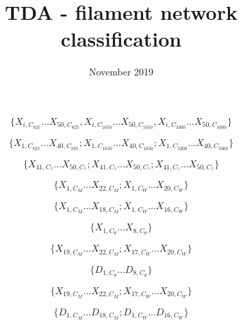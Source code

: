 \documentclass[10pt]{article}
\title{TDA - filament network classification}
\date{November 2019}
\begin{document}
\maketitle



$$
\{X_{i,C_{825}}...X_{50,C_{825}}, X_{i,C_{1650}}...X_{50,C_{1650}},X_{i,C_{3300}}...X_{50,C_{3300}}\}
$$


$$
\{X_{1,C_{825}}...X_{40,C_{825}}; X_{1,C_{1650}}...X_{40,C_{1650}}; X_{1,C_{3300}}...X_{40,C_{3300}}\}
$$

$$
\{X_{41,C_{?}}...X_{50,C_{?}}; X_{41,C_{?}}...X_{50,C_{?}}; X_{41,C_{?}}...X_{50,C_{?}}\}
$$


$$
\{X_{1,C_M}...X_{22,C_{M}}; X_{1,C_{W}}...X_{20,C_W}\}
$$

$$
\{X_{1,C_M}...X_{18,C_{M}}; X_{1,C_{W}}...X_{16,C_W}\}
$$

$$
\{X_{1,C_{\theta}}...X_{8,C_\theta}\}
$$

$$
\{X_{19,C_M}...X_{22,C_{M}}; X_{17,C_{W}}...X_{20,C_W}\}
$$


$$
\{D_{1,C_{\theta}}...D_{8,C_\theta}\}
$$

$$
\{X_{19,C_M}...X_{22,C_{M}}; X_{17,C_{W}}...X_{20,C_W}\}
$$

$$
\{D_{1,C_M}...D_{18,C_{M}}; D_{1,C_{W}}...D_{16,C_W}\}
$$
\end{document}
